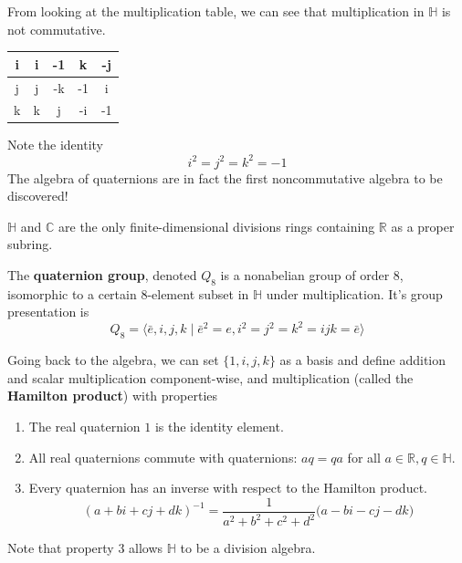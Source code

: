 \documentclass{article}
\begin{document}
    From looking at the multiplication table, we can see that multiplication in $\mathbb{H}$ is not commutative. 
    \begin{center}
      \begin{tabular}{|c|c|c|c|c|}
      \hline
      i & i & -1 & k & -j \\ 
      \hline
      j & j & -k & -1 & i \\ 
      \hline
      k & k & j & -i & -1 \\ 
      \hline
      \end{tabular}
    \end{center}
    Note the identity 
    \begin{equation}
      i^2 = j^2 = k^2 = -1
    \end{equation}
    The algebra of quaternions are in fact the first noncommutative algebra to be discovered! 

    \begin{proposition}
      $\mathbb{H}$ and $\mathbb{C}$ are the only finite-dimensional divisions rings containing $\mathbb{R}$ as a proper subring. 
    \end{proposition}

    \begin{definition}
      The \textbf{quaternion group}, denoted $Q_8$ is a nonabelian group of order $8$, isomorphic to a certain $8$-element subset in $\mathbb{H}$ under multiplication. It's group presentation is 
      \begin{equation}
        Q_8 = \big\langle \bar{e}, i, j, k \;|\; \bar{e}^2 = e, i^2 = j^2 = k^2 = ijk = \bar{e} \big\rangle
      \end{equation}
    \end{definition}

    Going back to the algebra, we can set $\{1, i, j, k\}$ as a basis and define addition and scalar multiplication component-wise, and multiplication (called the \textbf{Hamilton product}) with properties
    \begin{enumerate}
      \item The real quaternion $1$ is the identity element. 
      \item All real quaternions commute with quaternions: $a q = q a$ for all $a \in \mathbb{R}, q \in \mathbb{H}$. 
      \item Every quaternion has an inverse with respect to the Hamilton product. 
        \begin{equation}
          (a + bi + cj + dk)^{-1} = \frac{1}{a^2 + b^2 + c^2 + d^2} \big( a - bi - cj - dk\big)
        \end{equation}
    \end{enumerate}
    Note that property 3 allows $\mathbb{H}$ to be a division algebra. 
\end{document}
